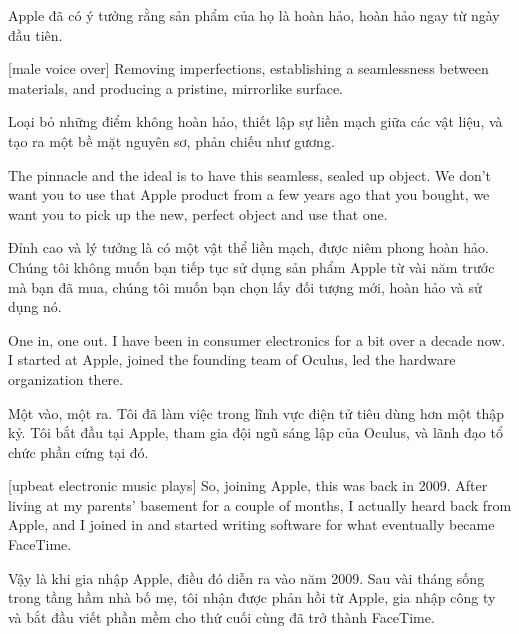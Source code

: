 \documentclass[a4paper]{article}
\begin{document}
	\begin{vietnamese-v2}
		[Nirav] Apple đã có ý tưởng rằng sản phẩm của họ là hoàn hảo, hoàn hảo ngay từ ngày đầu tiên.
	\end{vietnamese-v2}
	
	[male voice over] Removing imperfections, establishing a seamlessness between materials, and producing a pristine, mirrorlike surface.

	\begin{vietnamese-v2}
		 Loại bỏ những điểm không hoàn hảo, thiết lập sự liền mạch giữa các vật liệu, và tạo ra một bề mặt nguyên sơ, phản chiếu như gương.
	\end{vietnamese-v2}

	The pinnacle and the ideal is to have this seamless, sealed up object.
	We don't want you to use that Apple product from a few years ago that you bought, we want you to pick up the new, perfect object and use that one.

	\begin{vietnamese-v2}
		Đỉnh cao và lý tưởng là có một vật thể liền mạch, được niêm phong hoàn hảo. 
		Chúng tôi không muốn bạn tiếp tục sử dụng sản phẩm Apple từ vài năm trước mà bạn đã mua, chúng tôi muốn bạn chọn lấy đối tượng mới, hoàn hảo và sử dụng nó.
	\end{vietnamese-v2}

	One in, one out.
	I have been in consumer electronics for a bit over a decade now.
	I started at Apple, joined the founding team of Oculus, led the hardware organization there.
	
	\begin{vietnamese-v2}
		Một vào, một ra. 
		Tôi đã làm việc trong lĩnh vực điện tử tiêu dùng hơn một thập kỷ. 
		Tôi bắt đầu tại Apple, tham gia đội ngũ sáng lập của Oculus, và lãnh đạo tổ chức phần cứng tại đó.
	\end{vietnamese-v2}
	
	
	[upbeat electronic music plays]
	So, joining Apple, this was back in 2009.
	After living at my parents' basement for a couple of months, I actually heard back from Apple, and I joined in and started writing software for what eventually became FaceTime.
	
	\begin{vietnamese-v2}
		Vậy là khi gia nhập Apple, điều đó diễn ra vào năm 2009. 
		Sau vài tháng sống trong tầng hầm nhà bố mẹ, tôi nhận được phản hồi từ Apple, gia nhập công ty và bắt đầu viết phần mềm cho thứ cuối cùng đã trở thành FaceTime.
	\end{vietnamese-v2}
	
\end{document}
